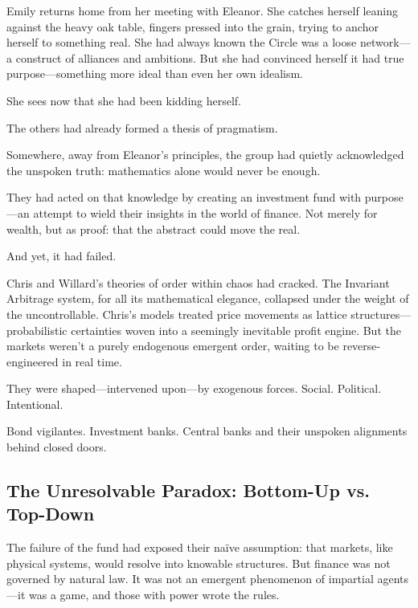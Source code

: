 Emily returns home from her meeting with Eleanor. She catches herself leaning against the heavy oak table, fingers pressed into the grain, trying to anchor herself to something real. She had always known the Circle was a loose network—a construct of alliances and ambitions. But she had convinced herself it had true purpose—something more ideal than even her own idealism.

She sees now that she had been kidding herself.

\smallskip

The others had already formed a thesis of pragmatism.

Somewhere, away from Eleanor’s principles, the group had quietly acknowledged the unspoken truth: mathematics alone would never be enough.

They had acted on that knowledge by creating an investment fund with purpose—an attempt to wield their insights in the world of finance. Not merely for wealth, but as proof: that the abstract could move the real.

\smallskip

And yet, it had failed.

\smallskip

Chris and Willard’s theories of order within chaos had cracked. The Invariant Arbitrage system, for all its mathematical elegance, collapsed under the weight of the uncontrollable. Chris’s models treated price movements as lattice structures—probabilistic certainties woven into a seemingly inevitable profit engine. But the markets weren’t a purely endogenous emergent order, waiting to be reverse-engineered in real time.

They were shaped—intervened upon—by exogenous forces.
Social. Political. Intentional.

Bond vigilantes. Investment banks. Central banks and their unspoken alignments behind closed doors.

\subsection*{The Unresolvable Paradox: Bottom-Up vs. Top-Down}

The failure of the fund had exposed their naïve assumption: that markets, like physical systems, would resolve into knowable structures. But finance was not governed by natural law. It was not an emergent phenomenon of impartial agents—it was a game, and those with power wrote the rules.

\smallskip

